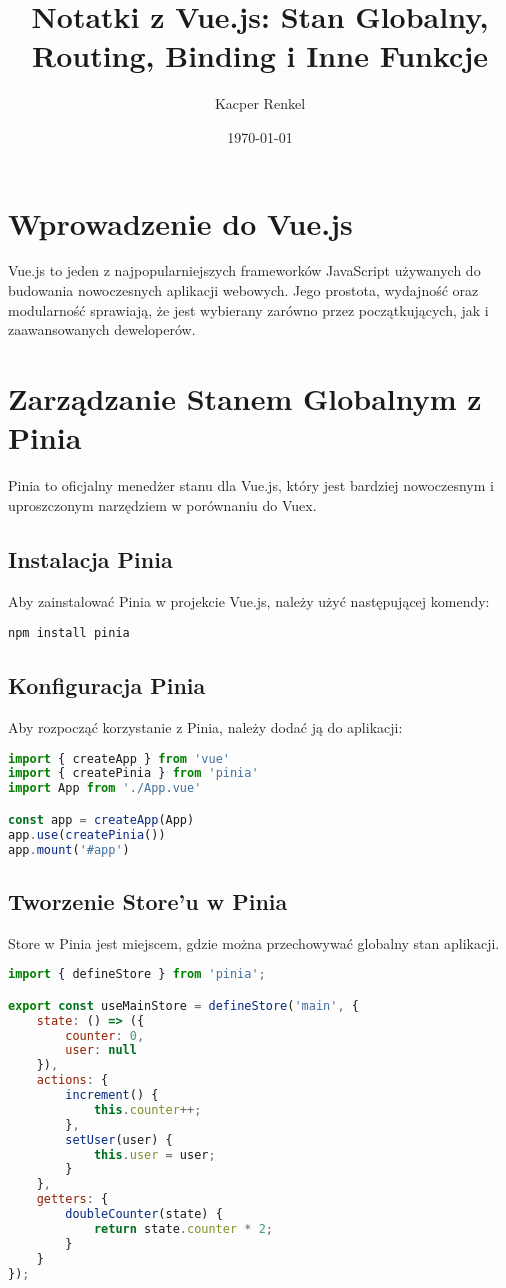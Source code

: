 \documentclass[a4paper,12pt]{article}
\title{Notatki z Vue.js: Stan Globalny, Routing, Binding i Inne Funkcje}
\author{Kacper Renkel}
\date{\today}
\begin{document}
\maketitle

\tableofcontents
\newpage

\section{Wprowadzenie do Vue.js}
Vue.js to jeden z najpopularniejszych frameworków JavaScript używanych do budowania nowoczesnych aplikacji webowych. Jego prostota, wydajność oraz modularność sprawiają, że jest wybierany zarówno przez początkujących, jak i zaawansowanych deweloperów.

\section{Zarządzanie Stanem Globalnym z Pinia}
Pinia to oficjalny menedżer stanu dla Vue.js, który jest bardziej nowoczesnym i uproszczonym narzędziem w porównaniu do Vuex.

\subsection{Instalacja Pinia}
Aby zainstalować Pinia w projekcie Vue.js, należy użyć następującej komendy:
\begin{verbatim}
npm install pinia
\end{verbatim}

\subsection{Konfiguracja Pinia}
Aby rozpocząć korzystanie z Pinia, należy dodać ją do aplikacji:
\begin{lstlisting}[language=JavaScript]
import { createApp } from 'vue'
import { createPinia } from 'pinia'
import App from './App.vue'

const app = createApp(App)
app.use(createPinia())
app.mount('#app')
\end{lstlisting}

\subsection{Tworzenie Store'u w Pinia}
Store w Pinia jest miejscem, gdzie można przechowywać globalny stan aplikacji.
\begin{lstlisting}[language=JavaScript]
import { defineStore } from 'pinia';

export const useMainStore = defineStore('main', {
    state: () => ({
        counter: 0,
        user: null
    }),
    actions: {
        increment() {
            this.counter++;
        },
        setUser(user) {
            this.user = user;
        }
    },
    getters: {
        doubleCounter(state) {
            return state.counter * 2;
        }
    }
});
\end{lstlisting}
\end{document}
